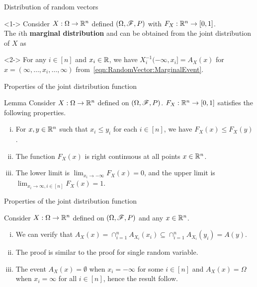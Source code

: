 \documentclass[12pt,aspectratio=169]{beamer}
\begin{document}
\begin{frame}{Distribution of random vectors}
\begin{cor}<1->
Consider $X: \Omega \to \mathbb{R}^n$ defined  $(\Omega, \mathscr{F}, P)$ with $F_X: \mathbb{R}^n \to [0,1]$.\\ 
The $i$th \textbf{marginal distribution} and can be obtained from the joint distribution of $X$ as 
\end{cor}
\begin{Proof}<2->
For any $i \in [n]$ and $x_i \in \mathbb{R}$,
we have $X_i^{-1}(-\infty, x_i] = A_X(x)$ for $x = (\infty, \dots, x_i, \dots, \infty)$ 
from~\eqref{eqn:RandomVector:MarginalEvent}.  
\end{Proof}
\end{frame}
\begin{frame}{Properties of the joint distribution function}
\begin{block}{Lemma} 
Consider $X: \Omega \to \mathbb{R}^n$ defined on $(\Omega,\mathscr{F},P)$. 
$F_X: \mathbb{R}^n \to [0,1]$ satisfies the following properties. 
\begin{enumerate}[(i)]
\item <2-> For $x, y \in \mathbb{R}^n$ such that $x_i \le y_i$ for each $i \in [n]$, we have $F_X(x) \le F_X(y)$. 
\item <3-> The function $F_X(x)$ is right continuous at all points $x \in \mathbb{R}^n$. 
\item <4-> The lower limit is $\lim_{x_i \to -\infty}F_X(x) = 0$, and the upper limit is $\lim_{x_i \to \infty, i \in [n]}F_X(x) = 1$.
\end{enumerate}
\end{block}
\end{frame}
\begin{frame}{Properties of the joint distribution function}
\begin{Proof}
Consider $X: \Omega \to \mathbb{R}^n$ defined on $(\Omega, \mathscr{F}, P)$ and any $x \in \mathbb{R}^n$. 
\begin{enumerate}[(i)]
\item <2-> We can verify that $A_X(x)  = \cap_{i=1}^nA_{X_i}(x_i) \subseteq \cap_{i=1}^nA_{X_i}(y_i) = A(y)$. 
\item <3-> The proof is similar to the proof for single random variable.  
\item <4-> The event $A_X(x) = \emptyset$ when $x_i = -\infty$ for some $i \in [n]$ and $A_X(x) = \Omega$ when $x_i = \infty$ for all $i \in [n]$, 
hence the result follow. 
\end{enumerate}
\end{Proof}
\end{frame}
\end{document}
